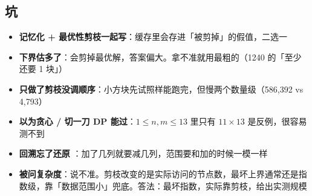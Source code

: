 \subsection{坑}
\begin{itemize}
\item \textbf{记忆化 + 最优性剪枝一起写}：缓存里会存进「被剪掉」的假值，二选一
\item \textbf{下界估多了}：会剪掉最优解，答案偏大。拿不准就用最粗的（1240 的「至少还要 1 块」）
\item \textbf{只做了剪枝没调顺序}：小方块先试照样能跑完，但慢两个数量级（586,392 vs 4,793）
\item \textbf{以为贪心 / 切一刀 DP 能过}：$1 \le n, m \le 13$ 里只有 $11 \times 13$ 是反例，很容易测不到
\item \textbf{回溯忘了还原} ：加了几列就要减几列，范围要和加的时候一模一样
\item \textbf{被问复杂度}：说不准。剪枝改变的是实际访问的节点数，最坏上界通常还是指数级，靠「数据范围小」兜底。答法：最坏指数，实际靠剪枝，给出实测规模
\end{itemize}
